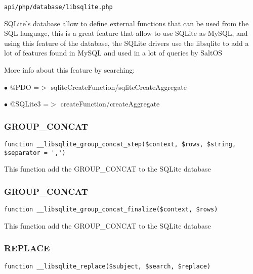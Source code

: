 \documentclass[a4paper]{article}
\begin{document}
\begin{lstlisting}
api/php/database/libsqlite.php
\end{lstlisting}

SQLite's database allow to define external functions that can be used from the SQL language,
this is a great feature that allow to use SQLite as MySQL, and using this feature of the
database, the SQLite drivers use the libsqlite to add a lot of features found in MySQL and
used in a lot of queries by SaltOS

More info about this feature by searching:

\begin{compactitem}
\item[\color{myblue}$\bullet$] @PDO     =$>$ sqliteCreateFunction/sqliteCreateAggregate
\item[\color{myblue}$\bullet$] @SQLite3 =$>$ createFunction/createAggregate
\end{compactitem}

\hypertarget{toc292}{}
\subsubsection{GROUP\_CONCAT}

\begin{lstlisting}
function __libsqlite_group_concat_step($context, $rows, $string, $separator = ',')
\end{lstlisting}

This function add the GROUP\_CONCAT to the SQLite database

\hypertarget{toc293}{}
\subsubsection{GROUP\_CONCAT}

\begin{lstlisting}
function __libsqlite_group_concat_finalize($context, $rows)
\end{lstlisting}

This function add the GROUP\_CONCAT to the SQLite database

\hypertarget{toc294}{}
\subsubsection{REPLACE}

\begin{lstlisting}
function __libsqlite_replace($subject, $search, $replace)
\end{lstlisting}
\end{document}
